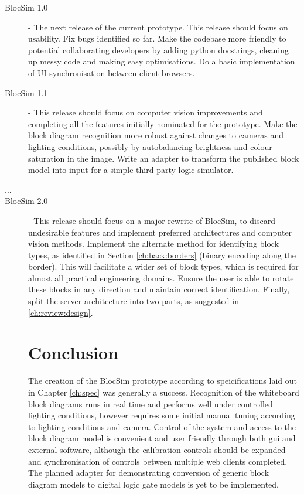 \begin{description}
	\item[BlocSim 1.0] - The next release of the current prototype. This release should focus on usability. Fix bugs identified so far. Make the codebase more friendly to potential collaborating developers by adding python docstrings, cleaning up messy code and making easy optimisations. Do a basic implementation of UI synchronisation between client browsers.
	\item[BlocSim 1.1] - This release should focus on computer vision improvements and completing all the features initially nominated for the prototype. Make the block diagram recognition more robust against changes to cameras and lighting conditions, possibly by autobalancing brightness and colour saturation in the image. Write an adapter to transform the published block model into input for a simple third-party logic simulator.
	\item[ ... ]
	\item[BlocSim 2.0] - This release should focus on a major rewrite of BlocSim, to discard undesirable features and implement preferred architectures and computer vision methods. Implement the alternate method for identifying block types, as identified in Section \ref{ch:back:borders} (binary encoding along the border). This will facilitate a wider set of block types, which is required for almost all practical engineering domains. Ensure the user is able to rotate these blocks in any direction and maintain correct identification. Finally, split the server architecture into two parts, as suggested in \ref{ch:review:design}. 


\chapter{Conclusion}

The creation of the BlocSim prototype according to speicifications laid out in Chapter \ref{ch:spec} was generally a success. Recognition of the whiteboard block diagrams runs in real time and performs well under controlled lighting conditions, however requires some initial manual tuning according to lighting conditions and camera. Control of the system and access to the block diagram model is convenient and user friendly through both \gls{gui} and external software, although the calibration controls should be expanded and synchronisation of controls between multiple web clients completed. The planned adapter for demonstrating conversion of generic block diagram models to digital logic gate models is yet to be implemented.
\\


\end{description}
